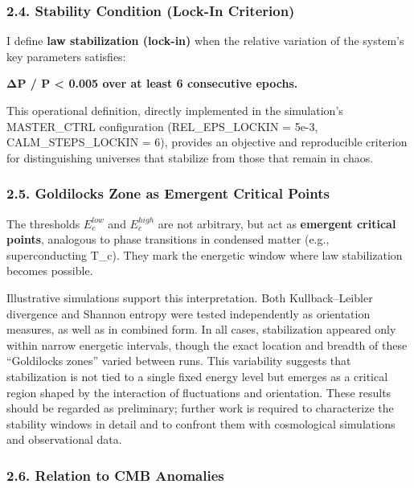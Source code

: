 \subsubsection{\texorpdfstring{\textbf{2.4. Stability Condition (Lock-In
Criterion)}}{2.4. Stability Condition (Lock-In Criterion)}}\label{stability-condition-lock-in-criterion}

I define \textbf{law stabilization (lock-in)} when the relative
variation of the system's key parameters satisfies:

\textbf{ΔP / P \textless{} 0.005 over at least 6 consecutive epochs.}

This operational definition, directly implemented in the simulation's
MASTER\_CTRL configuration (REL\_EPS\_LOCKIN = 5e-3, CALM\_STEPS\_LOCKIN
= 6), provides an objective and reproducible criterion for
distinguishing universes that stabilize from those that remain in chaos.

\subsubsection{\texorpdfstring{\textbf{2.5. Goldilocks Zone as Emergent
Critical
Points}}{2.5. Goldilocks Zone as Emergent Critical Points}}\label{goldilocks-zone-as-emergent-critical-points}

The thresholds \(E_c^{low}\) and \(E_c^{high}\) are not arbitrary, but
act as \textbf{emergent critical points}, analogous to phase transitions
in condensed matter (e.g., superconducting T\_c). They mark the
energetic window where law stabilization becomes possible.

Illustrative simulations support this interpretation. Both
Kullback--Leibler divergence and Shannon entropy were tested
independently as orientation measures, as well as in combined form. In
all cases, stabilization appeared only within narrow energetic
intervals, though the exact location and breadth of these ``Goldilocks
zones'' varied between runs. This variability suggests that
stabilization is not tied to a single fixed energy level but emerges as
a critical region shaped by the interaction of fluctuations and
orientation. These results should be regarded as preliminary; further
work is required to characterize the stability windows in detail and to
confront them with cosmological simulations and observational data.

\subsubsection{\texorpdfstring{\textbf{2.6. Relation to CMB
Anomalies}}{2.6. Relation to CMB Anomalies}}\label{relation-to-cmb-anomalies}

